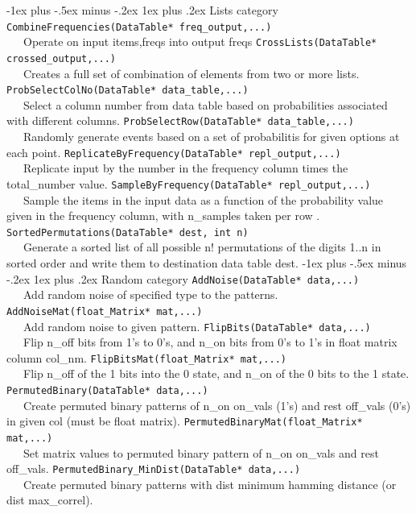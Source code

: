 \documentclass[10pt,landscape]{article}
\makeatletter
\renewcommand{\subsubsection}{\@startsection{subsubsection}{3}{0mm}%
                                {-1ex plus -.5ex minus -.2ex}%
                                {1ex plus .2ex}%
                                {\normalfont\small\bfseries}}
\makeatother
\begin{document}
\begin{multicols}{3}
\subsubsection{Lists category}
\verb!CombineFrequencies(DataTable* freq_output,...)!\\\ \ \ Operate on input items,freqs into output freqs
\verb!CrossLists(DataTable* crossed_output,...)!\\\ \ \ Creates a full set of combination of elements from two or more lists. \\
\verb!ProbSelectColNo(DataTable* data_table,...)!\\\ \ \ Select a column number from data table based on probabilities associated with different columns.
\verb!ProbSelectRow(DataTable* data_table,...)!\\\ \ \ Randomly generate events based on a set of probabilitis for given options at each point.
\verb!ReplicateByFrequency(DataTable* repl_output,...)!\\\ \ \ Replicate input by the number in the frequency column times the total\_number value.
\verb!SampleByFrequency(DataTable* repl_output,...)!\\\ \ \ Sample the items in the input data as a function of the probability value given in the frequency column, with n\_samples taken per row .
\verb!SortedPermutations(DataTable* dest, int n)!\\\ \ \ Generate a sorted list of all possible n! permutations of the digits 1..n in sorted order and write them to destination data table dest.
\subsubsection{Random category}
\verb!AddNoise(DataTable* data,...)!\\\ \ \ Add random noise of specified type to the patterns.
\verb!AddNoiseMat(float_Matrix* mat,...)!\\\ \ \ Add random noise to given pattern.
\verb!FlipBits(DataTable* data,...)!\\\ \ \ Flip n\_off bits from 1's to 0's, and n\_on bits from 0's to 1's in float matrix column col\_nm.
\verb!FlipBitsMat(float_Matrix* mat,...)!\\\ \ \ Flip n\_off of the 1 bits into the 0 state, and n\_on of the 0 bits to the 1 state.
\verb!PermutedBinary(DataTable* data,...)!\\\ \ \ Create permuted binary patterns of n\_on on\_vals (1's) and rest off\_vals (0's) in given col (must be float matrix).
\verb!PermutedBinaryMat(float_Matrix* mat,...)!\\\ \ \ Set matrix values to permuted binary pattern of n\_on on\_vals and rest off\_vals.
\verb!PermutedBinary_MinDist(DataTable* data,...)!\\\ \ \ Create permuted binary patterns with dist minimum hamming distance (or dist max\_correl).

\end{multicols}
\end{document}
